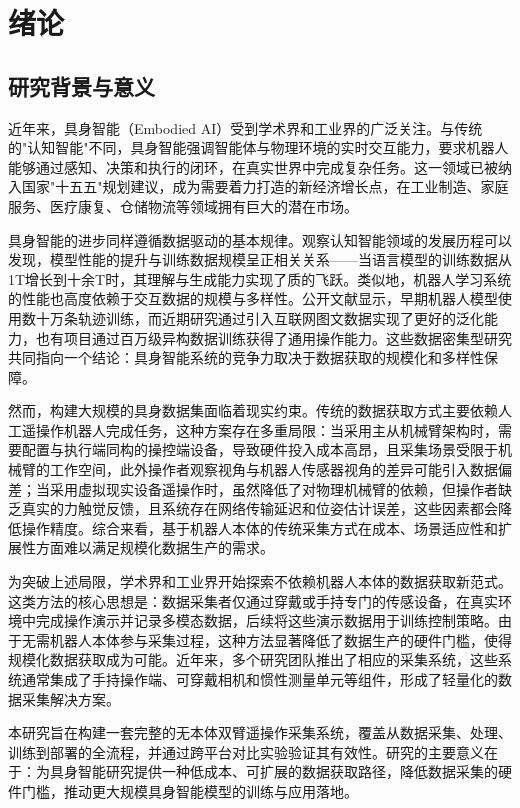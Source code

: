 \section{绪论}

\subsection{研究背景与意义}

近年来，具身智能（Embodied AI）受到学术界和工业界的广泛关注\cite{duan2022embodied}。与传统的"认知智能"不同，具身智能强调智能体与物理环境的实时交互能力，要求机器人能够通过感知、决策和执行的闭环，在真实世界中完成复杂任务\cite{billard2019learning,kroemer2021review}。这一领域已被纳入国家"十五五"规划建议，成为需要着力打造的新经济增长点，在工业制造、家庭服务、医疗康复、仓储物流等领域拥有巨大的潜在市场。

具身智能的进步同样遵循数据驱动的基本规律。观察认知智能领域的发展历程可以发现，模型性能的提升与训练数据规模呈正相关关系——当语言模型的训练数据从1T增长到十余T时，其理解与生成能力实现了质的飞跃。类似地，机器人学习系统的性能也高度依赖于交互数据的规模与多样性。公开文献显示，早期机器人模型使用数十万条轨迹训练，而近期研究通过引入互联网图文数据实现了更好的泛化能力，也有项目通过百万级异构数据训练获得了通用操作能力。这些数据密集型研究共同指向一个结论：具身智能系统的竞争力取决于数据获取的规模化和多样性保障。

然而，构建大规模的具身数据集面临着现实约束。传统的数据获取方式主要依赖人工遥操作机器人完成任务，这种方案存在多重局限：当采用主从机械臂架构时，需要配置与执行端同构的操控端设备，导致硬件投入成本高昂，且采集场景受限于机械臂的工作空间，此外操作者观察视角与机器人传感器视角的差异可能引入数据偏差；当采用虚拟现实设备遥操作时，虽然降低了对物理机械臂的依赖，但操作者缺乏真实的力触觉反馈，且系统存在网络传输延迟和位姿估计误差，这些因素都会降低操作精度。综合来看，基于机器人本体的传统采集方式在成本、场景适应性和扩展性方面难以满足规模化数据生产的需求。

为突破上述局限，学术界和工业界开始探索不依赖机器人本体的数据获取新范式。这类方法的核心思想是：数据采集者仅通过穿戴或手持专门的传感设备，在真实环境中完成操作演示并记录多模态数据，后续将这些演示数据用于训练控制策略。由于无需机器人本体参与采集过程，这种方法显著降低了数据生产的硬件门槛，使得规模化数据获取成为可能。近年来，多个研究团队推出了相应的采集系统，这些系统通常集成了手持操作端、可穿戴相机和惯性测量单元等组件，形成了轻量化的数据采集解决方案。

本研究旨在构建一套完整的无本体双臂遥操作采集系统，覆盖从数据采集、处理、训练到部署的全流程，并通过跨平台对比实验验证其有效性。研究的主要意义在于：为具身智能研究提供一种低成本、可扩展的数据获取路径，降低数据采集的硬件门槛，推动更大规模具身智能模型的训练与应用落地。


